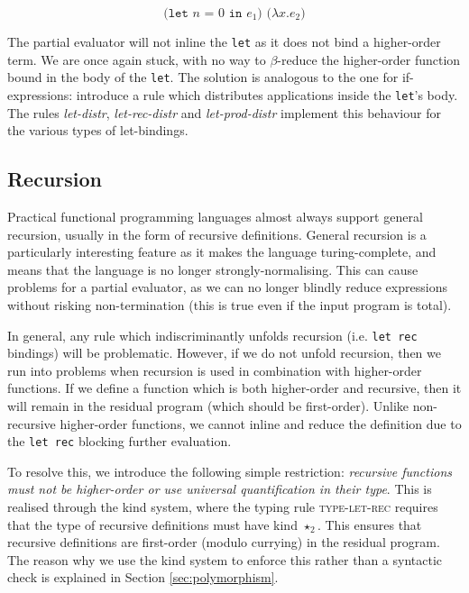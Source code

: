 \documentclass[runningheads]{llncs}
\begin{document}
\begin{equation*}
  \texttt{(let $n$ = $0$ in $e_1$) ($\lambda x. e_2$)}
\end{equation*}

The partial evaluator will not inline the \texttt{let} as it does not bind a higher-order term. We are once again stuck, with no way to $\beta$-reduce the higher-order function bound in the body of the \texttt{let}. The solution is analogous to the one for if-expressions: introduce a rule which distributes applications inside the \texttt{let}'s body. The rules \textit{let-distr}, \textit{let-rec-distr} and \textit{let-prod-distr} implement this behaviour for the various types of let-bindings.


\subsection{Recursion} \label{sec:recursion}

Practical functional programming languages almost always support general recursion, usually in the form of recursive definitions. General recursion is a particularly interesting feature as it makes the language turing-complete, and means that the language is no longer strongly-normalising. This can cause problems for a partial evaluator, as we can no longer blindly reduce expressions without risking non-termination (this is true even if the input program is total).

In general, any rule which indiscriminantly unfolds recursion (i.e. \texttt{let rec} bindings) will be problematic. However, if we do not unfold recursion, then we run into problems when recursion is used in combination with higher-order functions. If we define a function which is both higher-order and recursive, then it will remain in the residual program (which should be first-order). Unlike non-recursive higher-order functions, we cannot inline and reduce the definition due to the \texttt{let rec} blocking further evaluation.

To resolve this, we introduce the following simple restriction: \emph{recursive functions must not be higher-order or use universal quantification in their type}. This is realised through the kind system, where the typing rule \textsc{type-let-rec} requires that the type of recursive definitions must have kind $\star_2$. This ensures that recursive definitions are first-order (modulo currying) in the residual program. The reason why we use the kind system to enforce this rather than a syntactic check is explained in Section \ref{sec:polymorphism}.
\end{document}
